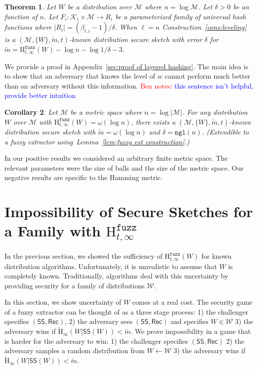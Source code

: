 \documentclass[11pt]{article}
\newcommand{\apref}[1]{\mbox{Appendix~\ref{#1}}}
\newcommand{\lemref}[1]{\mbox{Lemma~\ref{#1}}}
\newcommand{\consref}[1]{\mbox{Construction~\ref{#1}}}
\newcommand{\class}[1]{{\ensuremath{\mathsf{#1}}}}
\newcommand{\sketch}{\ensuremath{\class{SS}}\xspace}
\newcommand{\rec}{\ensuremath{\class{Rec}}\xspace}
\newcommand{\ngl}{\ensuremath{\mathtt{ngl}}\xspace}
\newcommand{\Hav}{\tilde{\mathrm{H}}_\infty}
\newcommand{\Hfuzz}{\mathrm{H}^{\mathtt{fuzz}}_{t,\infty}}
\newtheorem{theorem}{Theorem}[section]
\newtheorem{corollary}[theorem]{Corollary}
\newcommand{\authnote}[2]{{\textcolor{red}{\textsf{#1 notes: }\textcolor{blue}{ #2}}\marginpar{\textcolor{red}{\textbf{!!!!!}}}}}
\newcommand{\authnote}[2]{}
\newcommand{\bnote}[1]{{\authnote{Ben}{#1}}}
\newcommand{\M}{\mathcal{M}}
\begin{document}
\noindent

\begin{theorem}
\label{thm:layered hashing}
Let $W$ be a distribution over $\mathcal{M}$ where $n =\log \M$.  Let $\delta>0$ be an function of $n$.  Let $F_i: \mathcal{K}_i \times \mathcal{M}\rightarrow R_i$ be a parameterized family of universal hash functions where $|R_i| = (\beta_{t,i}-1) /\delta$.  When $\ell = n$ \consref{cons:leveling} is a $(\mathcal{M}, \{W\}, \tilde{m}, t)$-known distribution secure sketch with error $\delta$ for $\tilde{m} = \Hfuzz(W) - \log n - \log 1/\delta - 3$.

\end{theorem}
We provide a proof in \apref{sec:proof of layered hashing}.  The main idea is to show that an adversary that knows the level of $w$ cannot perform much better than an adversary without this information.  \bnote{this sentence isn't helpful, provide better intuition}

\begin{corollary}
\label{cor:extension to fuzz ext}
Let $\mathcal{M}$ be a metric space where $n = \log |\M|$.
For any distribution $W$ over $\mathcal{M}$ with $\Hfuzz(W)=\omega(\log n)$, there exists a $(\mathcal{M}, \{W\}, \tilde{m}, t)$-known distribution secure sketch with $\tilde{m} = \omega(\log n)$ and $\delta = \ngl(n)$.  (Extendible to a fuzzy extractor using~\lemref{lem:fuzzy ext construction}.)
\end{corollary}

\noindent
In our positive results we considered an arbitrary finite metric space.  The relevant parameters were the size of balls and the size of the metric space.  Our negative results are specific to the Hamming metric.

\section{Impossibility of Secure Sketches for a Family with $\Hfuzz$}
\label{sec:family of dist}

In the previous section, we showed the sufficiency of $\Hfuzz(W)$ for known distribution algorithms.  Unfortunately, it is unrealistic to assume that $W$ is completely known.  Traditionally, algorithms deal with this uncertainty by providing security for a family of distributions $\mathcal{W}$.  

In this section, we show uncertainty of $W$ comes at a real cost.  The security game of a fuzzy extractor can be thought of as a three stage process: 1) the challenger specifies $(\sketch, \rec)$, 2) the adversary sees $(\sketch, \rec)$ and specifies $W\in \mathcal{W}$ 3) the adversary wins if $\Hav(W|\sketch(W))< \tilde{m}$.  
We prove impossibility in a game that is harder for the adversary to win: 1) the challenger specifies $(\sketch, \rec)$ 2) the adversary samples a random distribution from $W\leftarrow \mathcal{W}$ 3) the adversary wins if $\Hav(W|\sketch(W)) < \tilde{m}$.  
\end{document}
